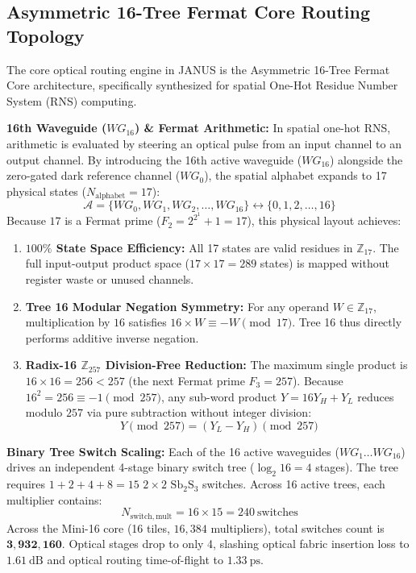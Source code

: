 \documentclass[journal]{IEEEtran}
\begin{document}
\subsection{Asymmetric 16-Tree Fermat Core Routing Topology}
The core optical routing engine in JANUS is the Asymmetric 16-Tree Fermat Core architecture, specifically synthesized for spatial One-Hot Residue Number System (RNS) computing.

\textbf{16th Waveguide ($WG_{16}$) \& Fermat Arithmetic:} In spatial one-hot RNS, arithmetic is evaluated by steering an optical pulse from an input channel to an output channel. By introducing the 16th active waveguide ($WG_{16}$) alongside the zero-gated dark reference channel ($WG_0$), the spatial alphabet expands to 17 physical states ($N_{\mathrm{alphabet}} = 17$):
\begin{equation}
    \mathcal{A} = \{ WG_0, WG_1, WG_2, \dots, WG_{16} \} \longleftrightarrow \{ 0, 1, 2, \dots, 16 \}
\end{equation}
Because $17$ is a Fermat prime ($F_2 = 2^{2^1} + 1 = 17$), this physical layout achieves:
\begin{enumerate}
    \item \textbf{$100\%$ State Space Efficiency:} All 17 states are valid residues in $\mathbb{Z}_{17}$. The full input-output product space ($17 \times 17 = 289$ states) is mapped without register waste or unused channels.
    \item \textbf{Tree 16 Modular Negation Symmetry:} For any operand $W \in \mathbb{Z}_{17}$, multiplication by $16$ satisfies $16 \times W \equiv -W \pmod{17}$. Tree 16 thus directly performs additive inverse negation.
    \item \textbf{Radix-16 $\mathbb{Z}_{257}$ Division-Free Reduction:} The maximum single product is $16 \times 16 = 256 < 257$ (the next Fermat prime $F_3 = 257$). Because $16^2 = 256 \equiv -1 \pmod{257}$, any sub-word product $Y = 16 Y_H + Y_L$ reduces modulo $257$ via pure subtraction without integer division:
    \begin{equation}
        Y \pmod{257} = (Y_L - Y_H) \pmod{257}
    \end{equation}
\end{enumerate}

\textbf{Binary Tree Switch Scaling:} Each of the 16 active waveguides ($WG_1 \dots WG_{16}$) drives an independent 4-stage binary switch tree ($\log_2 16 = 4$ stages). The tree requires $1 + 2 + 4 + 8 = 15$ $2 \times 2$ $\mathrm{Sb_2S_3}$ switches. Across 16 active trees, each multiplier contains:
\begin{equation}
    N_{\mathrm{switch,mult}} = 16 \times 15 = 240~\mathrm{switches}
\end{equation}
Across the Mini-16 core (16 tiles, $16,384$ multipliers), total switches count is $\mathbf{3,932,160}$. Optical stages drop to only 4, slashing optical fabric insertion loss to $1.61~\mathrm{dB}$ and optical routing time-of-flight to $1.33~\mathrm{ps}$.
\end{document}
